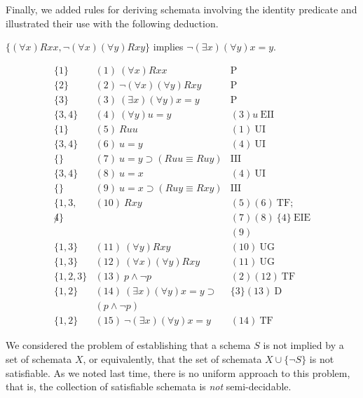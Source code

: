 \iffalse
Finally, we added rules for deriving schemata involving the identity predicate and illustrated their use with the following deduction.
\begin{center}
$\{(\forall x) Rxx, \neg (\forall x)(\forall y) Rxy \}$
implies $\neg (\exists x)(\forall y) x = y$.
\end{center}
\[
\begin{array}{lll}
\{1\}   & (1)\ (\forall x) Rxx  & \mathrm{P}\\
\{2\}   & (2)\ \neg (\forall x)(\forall y) Rxy  & \mathrm{P}\\
\{3\}   & (3)\ (\exists x)(\forall y) x = y  & \mathrm{P}\\
\{3,4\}   & (4)\ (\forall y) u = y  & (3)u\ \mathrm{EII}\\
\{1\}   & (5)\ Ruu  & (1)\ \mathrm{UI}\\
\{3,4\}   & (6)\ u=y  & (4)\ \mathrm{UI}\\
\{\}   & (7)\ u=y \supset (Ruu \equiv Ruy) & \mathrm{III}\\
\{3,4\}   & (8)\ u=x  & (4)\ \mathrm{UI}\\
\{\}   & (9)\ u=x \supset (Ruy \equiv Rxy) & \mathrm{III}\\
\{1,3,   & (10)\ Rxy  & (5)(6)\ \mathrm{TF};\\
\not4\} &  & (7)(8)\ \{4\}\ \mathrm{EIE} \\
 & & (9)\\
\{1,3\}   & (11)\ (\forall y)Rxy  & (10)\ \mathrm{UG}\\
\{1,3\}   & (12)\ (\forall x)(\forall y)Rxy  & (11)\ \mathrm{UG}\\
\{1,2,3\}   & (13)\ p \wedge \neg p  & (2)(12)\ \mathrm{TF}\\
\{1,2\}   & (14)\ (\exists x)(\forall y) x = y  \supset
& \{3\}(13)\ \mathrm{D}\\
 & (p \wedge \neg p) & \\
\{1,2\}   & (15)\ \neg (\exists x)(\forall y) x = y  & (14)\ \mathrm{TF}
\end{array}
\]

We considered the problem of establishing that a schema $S$ is not implied by a set of schemata $X$, or equivalently, that the set of schemata $X\cup\{\neg S\}$ is not satisfiable. As we noted last time, there is no uniform approach to this problem, that is, the collection of satisfiable schemata is \emph{not} semi-decidable.

